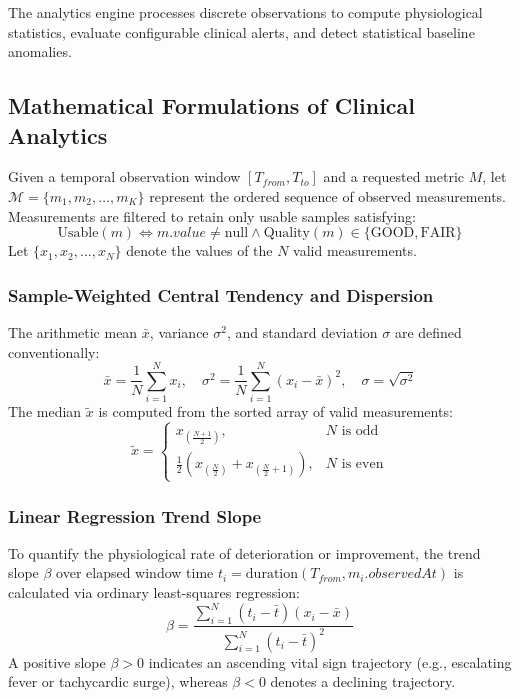\documentclass[10pt,journal,compsoc]{IEEEtran}
\begin{document}
The analytics engine processes discrete observations to compute physiological statistics, evaluate configurable clinical alerts, and detect statistical baseline anomalies.

\subsection{Mathematical Formulations of Clinical Analytics}
Given a temporal observation window $[T_{from}, T_{to}]$ and a requested metric $M$, let $\mathcal{M} = \{m_1, m_2, \dots, m_K\}$ represent the ordered sequence of observed measurements. Measurements are filtered to retain only usable samples satisfying:
\begin{equation}
\text{Usable}(m) \iff m.value \neq \text{null} \land \text{Quality}(m) \in \{\text{GOOD}, \text{FAIR}\}
\end{equation}
Let $\{x_1, x_2, \dots, x_N\}$ denote the values of the $N$ valid measurements.

\subsubsection{Sample-Weighted Central Tendency and Dispersion}
The arithmetic mean $\bar{x}$, variance $\sigma^2$, and standard deviation $\sigma$ are defined conventionally:
\begin{equation}
\bar{x} = \frac{1}{N} \sum_{i=1}^N x_i, \quad \sigma^2 = \frac{1}{N} \sum_{i=1}^N (x_i - \bar{x})^2, \quad \sigma = \sqrt{\sigma^2}
\end{equation}
The median $\tilde{x}$ is computed from the sorted array of valid measurements:
\begin{equation}
\tilde{x} = \begin{cases}
x_{\left(\frac{N+1}{2}\right)}, & N \text{ is odd} \\
\frac{1}{2}\left(x_{\left(\frac{N}{2}\right)} + x_{\left(\frac{N}{2}+1\right)}\right), & N \text{ is even}
\end{cases}
\end{equation}

\subsubsection{Linear Regression Trend Slope}
To quantify the physiological rate of deterioration or improvement, the trend slope $\beta$ over elapsed window time $t_i = \text{duration}(T_{from}, m_i.observedAt)$ is calculated via ordinary least-squares regression:
\begin{equation}
\beta = \frac{\sum_{i=1}^N (t_i - \bar{t})(x_i - \bar{x})}{\sum_{i=1}^N (t_i - \bar{t})^2}
\end{equation}
A positive slope $\beta > 0$ indicates an ascending vital sign trajectory (e.g., escalating fever or tachycardic surge), whereas $\beta < 0$ denotes a declining trajectory.
\end{document}

